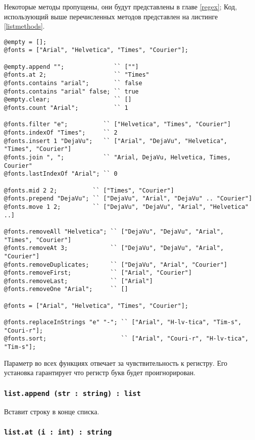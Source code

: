 Некоторые методы пропущены, они будут представлены в главе \ref{regex}; Код, использующий выше перечисленных методов представлен на листинге \ref{listmethods}. 

\begin{lstlisting}[caption=Методы класса list, label=listmethods]
@empty = [];
@fonts = ["Arial", "Helvetica", "Times", "Courier"];

@empty.append "";              `` [""]
@fonts.at 2;                   `` "Times"
@fonts.contains "arial";       `` false
@fonts.contains "arial" false; `` true
@empty.clear;                  `` []
@fonts.count "Arial";          `` 1

@fonts.filter "e";          `` ["Helvetica", "Times", "Courier"]
@fonts.indexOf "Times";     `` 2
@fonts.insert 1 "DejaVu";   `` ["Arial", "DejaVu", "Helvetica", "Times", "Courier"]
@fonts.join ", ";           `` "Arial, DejaVu, Helvetica, Times, Courier"
@fonts.lastIndexOf "Arial"; `` 0

@fonts.mid 2 2;          `` ["Times", "Courier"]
@fonts.prepend "DejaVu"; `` ["DejaVu", "Arial", "DejaVu" .. "Courier"]
@fonts.move 1 2;         `` ["DejaVu", "DejaVu", "Arial", "Helvetica" ..]

@fonts.removeAll "Helvetica"; `` ["DejaVu", "DejaVu", "Arial", "Times", "Courier"]
@fonts.removeAt 3;            `` ["DejaVu", "DejaVu", "Arial", "Courier"]
@fonts.removeDuplicates;      `` ["DejaVu", "Arial", "Courier"]
@fonts.removeFirst;           `` ["Arial", "Courier"]
@fonts.removeLast;            `` ["Arial"]
@fonts.removeOne "Arial";     `` []

@fonts = ["Arial", "Helvetica", "Times", "Courier"];

@fonts.replaceInStrings "e" "-"; `` ["Arial", "H-lv-tica", "Tim-s", "Couri-r"];
@fonts.sort;                     `` ["Arial", "Couri-r", "H-lv-tica", "Tim-s"];
\end{lstlisting}

Параметр  во всех функциях отвечает за чувствительность к регистру. Его установка гарантирует что регистр букв будет проигнорирован.

\subsubsection{\lstinline|list.append (str : string) : list|}

Вставит строку  в конце списка.

\subsubsection{\lstinline|list.at (i : int) : string|}

